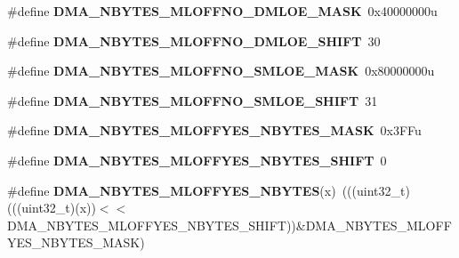 \begin{DoxyCompactItemize}
\item 
\#define {\bfseries D\+M\+A\+\_\+\+N\+B\+Y\+T\+E\+S\+\_\+\+M\+L\+O\+F\+F\+N\+O\+\_\+\+D\+M\+L\+O\+E\+\_\+\+M\+A\+SK}~0x40000000u\hypertarget{group__DMA__Register__Masks_ga3059dc9418c2806216aa96ef75adb3fe}{}\label{group__DMA__Register__Masks_ga3059dc9418c2806216aa96ef75adb3fe}

\item 
\#define {\bfseries D\+M\+A\+\_\+\+N\+B\+Y\+T\+E\+S\+\_\+\+M\+L\+O\+F\+F\+N\+O\+\_\+\+D\+M\+L\+O\+E\+\_\+\+S\+H\+I\+FT}~30\hypertarget{group__DMA__Register__Masks_ga761f3f81137087b195be0750f33d7c5a}{}\label{group__DMA__Register__Masks_ga761f3f81137087b195be0750f33d7c5a}

\item 
\#define {\bfseries D\+M\+A\+\_\+\+N\+B\+Y\+T\+E\+S\+\_\+\+M\+L\+O\+F\+F\+N\+O\+\_\+\+S\+M\+L\+O\+E\+\_\+\+M\+A\+SK}~0x80000000u\hypertarget{group__DMA__Register__Masks_gafda1d79fea3353361f7ae8b49c44e20f}{}\label{group__DMA__Register__Masks_gafda1d79fea3353361f7ae8b49c44e20f}

\item 
\#define {\bfseries D\+M\+A\+\_\+\+N\+B\+Y\+T\+E\+S\+\_\+\+M\+L\+O\+F\+F\+N\+O\+\_\+\+S\+M\+L\+O\+E\+\_\+\+S\+H\+I\+FT}~31\hypertarget{group__DMA__Register__Masks_ga7fe83f71aff1752703f2ec145d70571a}{}\label{group__DMA__Register__Masks_ga7fe83f71aff1752703f2ec145d70571a}

\item 
\#define {\bfseries D\+M\+A\+\_\+\+N\+B\+Y\+T\+E\+S\+\_\+\+M\+L\+O\+F\+F\+Y\+E\+S\+\_\+\+N\+B\+Y\+T\+E\+S\+\_\+\+M\+A\+SK}~0x3\+F\+Fu\hypertarget{group__DMA__Register__Masks_ga83bbf68562a7ac3e45fb940a1a7f18f8}{}\label{group__DMA__Register__Masks_ga83bbf68562a7ac3e45fb940a1a7f18f8}

\item 
\#define {\bfseries D\+M\+A\+\_\+\+N\+B\+Y\+T\+E\+S\+\_\+\+M\+L\+O\+F\+F\+Y\+E\+S\+\_\+\+N\+B\+Y\+T\+E\+S\+\_\+\+S\+H\+I\+FT}~0\hypertarget{group__DMA__Register__Masks_ga30c39f4b863f96ab4563e05480f0c63e}{}\label{group__DMA__Register__Masks_ga30c39f4b863f96ab4563e05480f0c63e}

\item 
\#define {\bfseries D\+M\+A\+\_\+\+N\+B\+Y\+T\+E\+S\+\_\+\+M\+L\+O\+F\+F\+Y\+E\+S\+\_\+\+N\+B\+Y\+T\+ES}(x)~(((uint32\+\_\+t)(((uint32\+\_\+t)(x))$<$$<$D\+M\+A\+\_\+\+N\+B\+Y\+T\+E\+S\+\_\+\+M\+L\+O\+F\+F\+Y\+E\+S\+\_\+\+N\+B\+Y\+T\+E\+S\+\_\+\+S\+H\+I\+FT))\&D\+M\+A\+\_\+\+N\+B\+Y\+T\+E\+S\+\_\+\+M\+L\+O\+F\+F\+Y\+E\+S\+\_\+\+N\+B\+Y\+T\+E\+S\+\_\+\+M\+A\+SK)\hypertarget{group__DMA__Register__Masks_gaab46ecd8c1a7d2849248ee5ea3271873}{}\label{group__DMA__Register__Masks_gaab46ecd8c1a7d2849248ee5ea3271873}


\end{DoxyCompactItemize}
